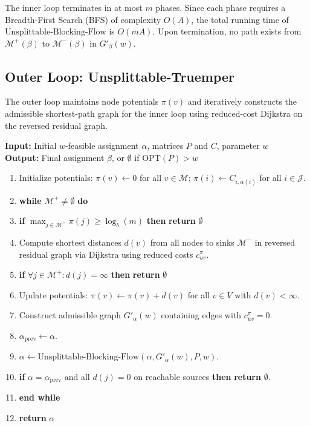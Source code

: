\documentclass{article}
\begin{document}
\begin{theorem}
\label{thm:ubf_complexity}
The inner loop terminates in at most $m$ phases. Since each phase requires a Breadth-First Search (BFS) of complexity $O(A)$, the total running time of $\text{Unsplittable-Blocking-Flow}$ is $O(mA)$. Upon termination, no path exists from $\mathcal{M}^+(\beta)$ to $\mathcal{M}^-(\beta)$ in $G'_\beta(w)$.
\end{theorem}

\subsection{Outer Loop: Unsplittable-Truemper}
The outer loop maintains node potentials $\pi(v)$ and iteratively constructs the admissible shortest-path graph for the inner loop using reduced-cost Dijkstra on the reversed residual graph.

\begin{algorithm}[t]
\caption{Unsplittable-Truemper$(\alpha, P, C, w)$}
\label{alg:truemper}
\small
\textbf{Input:} Initial $w$-feasible assignment $\alpha$, matrices $P$ and $C$, parameter $w$\\
\textbf{Output:} Final assignment $\beta$, or $\emptyset$ if $\text{OPT}(P) > w$
\begin{enumerate}\setlength{\itemsep}{1pt}\setlength{\parskip}{0pt}
    \item Initialize potentials: $\pi(v) \leftarrow 0$ for all $v \in \mathcal{M}$; $\pi(i) \leftarrow C_{i, \alpha(i)}$ for all $i \in \mathcal{J}$.
    \item \textbf{while} $\mathcal{M}^+ \neq \emptyset$ \textbf{do}
    \item \quad \textbf{if} $\max_{j \in \mathcal{M}^+} \pi(j) \ge \log_b(m)$ \textbf{then} \textbf{return} $\emptyset$ 
    \item \quad Compute shortest distances $d(v)$ from all nodes to sinks $\mathcal{M}^-$ in reversed residual graph via Dijkstra using reduced costs $c_{uv}^\pi$.
    \item \quad \textbf{if} $\forall j \in \mathcal{M}^+: d(j) = \infty$ \textbf{then} \textbf{return} $\emptyset$ 
    \item \quad Update potentials: $\pi(v) \leftarrow \pi(v) + d(v)$ for all $v \in V$ with $d(v) < \infty$.
    \item \quad Construct admissible graph $G'_\alpha(w)$ containing edges with $c_{uv}^\pi = 0$.
    \item \quad $\alpha_{\text{prev}} \leftarrow \alpha$.
    \item \quad $\alpha \leftarrow \text{Unsplittable-Blocking-Flow}(\alpha, G'_\alpha(w), P, w)$.
    \item \quad \textbf{if} $\alpha = \alpha_{\text{prev}}$ and all $d(j) = 0$ on reachable sources \textbf{then} \textbf{return} $\emptyset$.
    \item \textbf{end while}
    \item \textbf{return} $\alpha$
\end{enumerate}
\end{algorithm}
\end{document}
